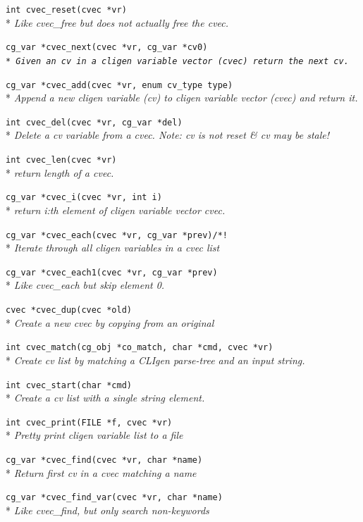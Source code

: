 \documentclass[a4paper, 10pt] {article}
\begin{document}
{\tt int cvec\_reset(cvec *vr)}\\*
\emph{ Like cvec\_free but does not actually free the cvec.}

{\tt cg\_var *cvec\_next(cvec *vr, cg\_var *cv0)\\*
\emph{  Given an cv in a cligen variable vector (cvec) return the next cv.}

{\tt cg\_var *cvec\_add(cvec *vr, enum cv\_type type)}\\*
\emph{  Append a new cligen variable (cv) to cligen variable vector (cvec) and return it.}

{\tt int cvec\_del(cvec *vr, cg\_var *del)}\\*
\emph{  Delete a cv variable from a cvec. Note: cv is not reset & cv may be stale!}

{\tt int cvec\_len(cvec *vr)}\\*
\emph{ return length of a cvec.}

{\tt cg\_var *cvec\_i(cvec *vr, int i)}\\*
\emph{ return i:th element of cligen variable vector cvec.}

{\tt cg\_var *cvec\_each(cvec *vr, cg\_var *prev)/*! }\\*
\emph{ Iterate through all cligen variables in a cvec list}

{\tt cg\_var *cvec\_each1(cvec *vr, cg\_var *prev)}\\*
\emph{ Like cvec\_each but skip element 0. }

{\tt cvec *cvec\_dup(cvec *old)}\\*
\emph{  Create a new cvec by copying from an original}

{\tt int cvec\_match(cg\_obj *co\_match, char   *cmd, cvec   *vr)}\\*
\emph{ Create cv list by matching a CLIgen parse-tree and an input string. }

{\tt int cvec\_start(char   *cmd)}\\*
\emph{ Create a cv list with a single string element. }

{\tt int cvec\_print(FILE *f, cvec *vr)}\\*
\emph{ Pretty print cligen variable list to a file}

{\tt cg\_var *cvec\_find(cvec *vr, char *name)}\\*
\emph{ Return first cv in a cvec matching a name}

{\tt cg\_var *cvec\_find\_var(cvec *vr, char *name)}\\*
\emph{  Like cvec\_find, but only search non-keywords}

}
\end{document}
